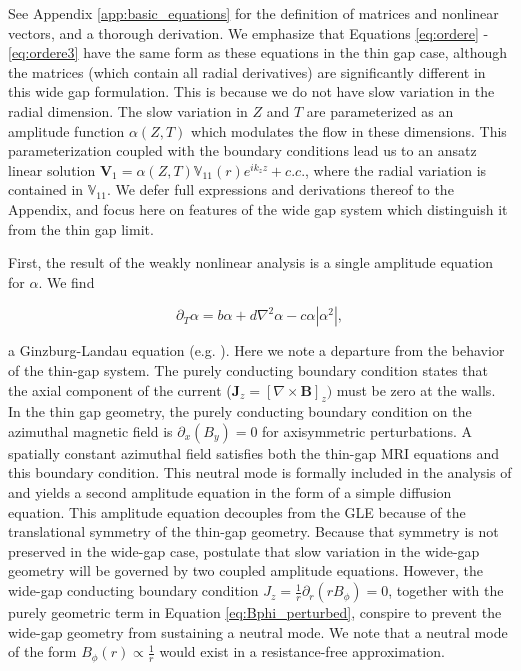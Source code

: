 \documentclass[onecolumn]{emulateapj}
\newcommand{\beq}{\begin{equation}}
\newcommand{\eeq}{\end{equation}}
\newcommand{\citei}[1]{\citeauthor{#1} \citeyear{#1}}
\begin{document}
See Appendix \ref{app:basic_equations} for the definition of matrices and nonlinear vectors, and a thorough derivation. We emphasize that Equations \ref{eq:ordere} - \ref{eq:ordere3} have the same form as these equations in the thin gap case, although the matrices (which contain all radial derivatives) are significantly different in this wide gap formulation. This is because we do not have slow variation in the radial dimension. The slow variation in $Z$ and $T$ are parameterized as an amplitude function $\alpha(Z, T)$ which modulates the flow in these dimensions. This parameterization coupled with the boundary conditions lead us to an ansatz linear solution $\mathbf{V}_1 = \alpha(Z, T) \mathbb{V}_{11}(r) e^{i k_z z} + c.c.$, where the radial variation is contained in $\mathbb{V}_{11}$. We defer full expressions and derivations thereof to the Appendix, and focus here on features of the wide gap system which distinguish it from the thin gap limit.

First, the result of the weakly nonlinear analysis is a single amplitude equation for $\alpha$. We find

\beq
 \label{eq:gle}
\partial_T \alpha = b \alpha + d \nabla^2 \alpha - c \alpha \left|\alpha^2\right|,
\eeq

a Ginzburg-Landau equation (e.g. \cite{Aranson:2002}). Here we note a departure from the behavior of the thin-gap system. The purely conducting boundary condition states that the axial component of the current ($\mathbf{J}_z = [\nabla \times \mathbf{B}]_z)$ must be zero at the walls. In the thin gap geometry, the purely conducting boundary condition on the azimuthal magnetic field is $\partial_x(B_y) = 0$ for axisymmetric perturbations. A spatially constant azimuthal field satisfies both the thin-gap MRI equations and this boundary condition. This neutral mode is formally included in the analysis of \citei{Umurhan:2007hs} and yields a second amplitude equation in the form of a simple diffusion equation. This amplitude equation decouples from the GLE because of the translational symmetry of the thin-gap geometry. Because that symmetry is not preserved in the wide-gap case, \citeauthor{Umurhan:2007hs} postulate that slow variation in the wide-gap geometry will be governed by two coupled amplitude equations. However, the wide-gap conducting boundary condition $J_z = \frac{1}{r} \partial_r (r B_\phi) = 0$, together with the purely geometric term in Equation \ref{eq:Bphi_perturbed}, conspire to prevent the wide-gap geometry from sustaining a neutral mode. We note that a neutral mode of the form $B_\phi(r) \propto \frac{1}{r}$ would exist in a resistance-free approximation.
\end{document}

